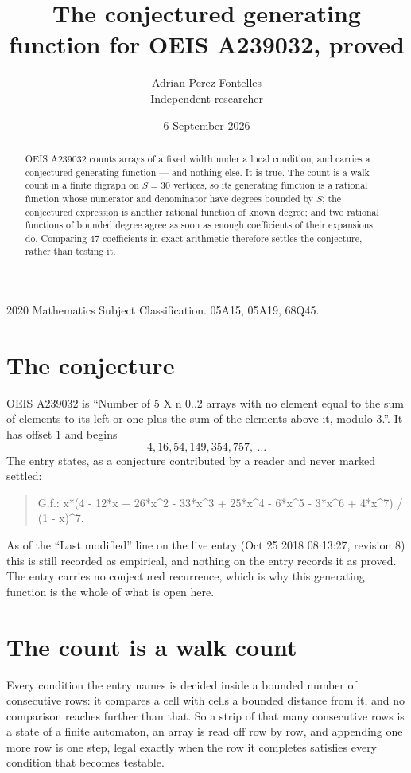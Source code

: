 \documentclass[11pt,a4paper]{article}
\title{The conjectured generating function for OEIS A239032, proved}
\author{Adrian Perez Fontelles\\ \small Independent researcher}
\date{6 September 2026}
\theoremstyle{plain}
\theoremstyle{definition}
\begin{document}
\maketitle

\begin{abstract}
OEIS A239032 counts arrays of a fixed width under a local condition, and carries a conjectured
generating function --- and nothing else. It is true. The count is a walk count in a finite
digraph on $S=30$ vertices, so its generating function is a rational function whose numerator
and denominator have degrees bounded by $S$; the conjectured expression is another rational
function of known degree; and two rational functions of bounded degree agree as soon as enough
coefficients of their expansions do. Comparing $47$ coefficients in exact arithmetic
therefore settles the conjecture, rather than testing it.
\end{abstract}

\noindent\small 2020 Mathematics Subject Classification. 05A15, 05A19, 68Q45.\normalsize

\section{The conjecture}

OEIS A239032 is ``Number of 5 X n 0..2 arrays with no element equal to the sum of elements to its left or one plus the sum of the elements above it, modulo 3.''. It has offset $1$ and begins
\[
4, 16, 54, 149, 354, 757,\ \dots
\]
The entry states, as a conjecture contributed by a reader and never marked settled:
\begin{quote}
G.f.: x*(4 - 12*x + 26*x\^{}2 - 33*x\^{}3 + 25*x\^{}4 - 6*x\^{}5 - 3*x\^{}6 + 4*x\^{}7) / (1 - x)\^{}7.
\end{quote}
As of the ``Last modified'' line on the live entry (Oct 25 2018 08:13:27, revision 8) this is still
recorded as empirical, and nothing on the entry records it as proved. The entry carries no
conjectured recurrence, which is why this generating function is the whole of what is open
here.

\section{The count is a walk count}

Every condition the entry names is decided inside a bounded number of consecutive rows: it
compares a cell with cells a bounded distance from it, and no comparison reaches further than
that. So a strip of that many consecutive rows is a state of a finite automaton, an array is
read off row by row, and appending one more row is one step, legal exactly when the row it
completes satisfies every condition that becomes testable.
\end{document}
